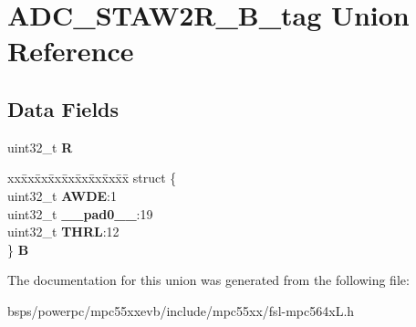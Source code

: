\hypertarget{unionADC__STAW2R__32B__tag}{}\section{A\+D\+C\+\_\+\+S\+T\+A\+W2\+R\+\_\+B\+\_\+tag Union Reference}
\label{unionADC__STAW2R__32B__tag}
\subsection*{Data Fields}
\begin{DoxyCompactItemize}
\item 
\mbox{\label{unionADC__STAW2R__32B__tag_ac026afe4e8a1dc479d71437e2d9cb7bd}} 
uint32\+\_\+t {\bfseries R}
\item 
\mbox{\label{unionADC__STAW2R__32B__tag_a5da58fe9a5e8f404aeadccff0a229686}} 
\begin{tabbing}
xx\=xx\=xx\=xx\=xx\=xx\=xx\=xx\=xx\=\kill
struct \{\\
\>uint32\_t {\bfseries AWDE}:1\\
\>uint32\_t {\bfseries \_\_pad0\_\_}:19\\
\>uint32\_t {\bfseries THRL}:12\\
\} {\bfseries B}\\

\end{tabbing}\end{DoxyCompactItemize}


The documentation for this union was generated from the following file\+:\begin{DoxyCompactItemize}
\item 
bsps/powerpc/mpc55xxevb/include/mpc55xx/fsl-\/mpc564x\+L.\+h\end{DoxyCompactItemize}

